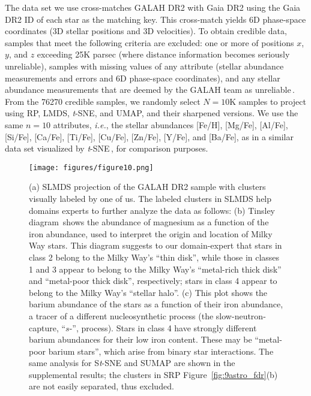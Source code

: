 \documentclass[sagev,Afour,times]{sagej}
\begin{document}
\par The data set we use cross-matches GALAH DR2 with Gaia DR2 using the Gaia DR2 ID of each star as the matching key. This cross-match yields 6D phase-space coordinates (3D stellar positions and 3D velocities). To obtain credible data, samples that meet the following criteria are excluded: one or more of positions $x$, $y$, and $z$ exceeding 25K parsec (where distance information becomes seriously unreliable), samples with missing values of any attribute (stellar abundance measurements and errors and 6D phase-space coordinates), and any stellar abundance measurements that are deemed by the GALAH team as unreliable\,\cite{astro:GALAHDR2}. From the 76270 credible samples, we randomly select $N=10\mathrm{K}$ samples to project using RP, LMDS, \emph{t}-SNE, and UMAP, and their sharpened versions. We use the same $n=10$ attributes, \emph{i.e.}, the stellar abundances [Fe/H], [Mg/Fe], [Al/Fe], [Si/Fe], [Ca/Fe], [Ti/Fe], [Cu/Fe], [Zn/Fe], [Y/Fe], and [Ba/Fe], 
as in a similar data set visualized by \emph{t}-SNE\,\cite{tsne:astro}, for comparison purposes.

\begin{figure}[htb]
  \centering
  \texttt{[image: figures/figure10.png]}
  \parbox[t]{0.9\columnwidth}{\relax}
  \caption{\label{fig:10astro_tinsley} (a) SLMDS projection of the GALAH DR2 sample with clusters visually labeled by one of us. The labeled clusters in SLMDS help domains experts to further analyze the data as follows: (b) Tinsley diagram\,\cite{Tinsley80} shows the abundance of magnesium as a function of the iron abundance, used to interpret the origin and location of Milky Way stars. This diagram suggests to our domain-expert that stars in class 2 belong to the Milky Way's ``thin disk'', while those in classes 1 and 3 appear to belong to the Milky Way's ``metal-rich thick disk'' and ``metal-poor thick disk'', respectively; stars in class 4 appear to belong to the Milky Way's ``stellar halo''. (c) This plot shows the barium abundance of the stars as a function of their iron abundance, a tracer of a different nucleosynthetic process (the slow-neutron-capture, ``$s$-'', process). Stars in class 4 have strongly different barium abundances for their low iron content. These may be ``metal-poor barium stars'', which arise from binary star interactions. The same analysis for S\emph{t}-SNE and SUMAP are shown in the supplemental results; the clusters in SRP Figure~\ref{fig:9astro_fdr}(b) are not easily separated, thus excluded.}
\end{figure}
\end{document}
